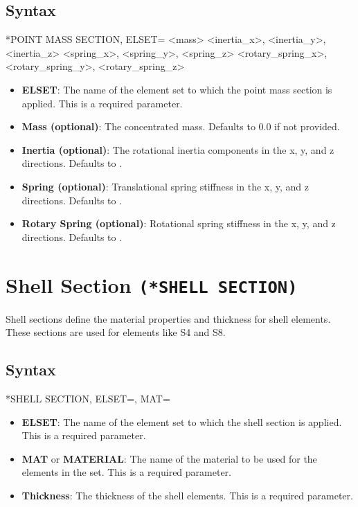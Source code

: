 \subsection{Syntax}
\begin{codeBlock}
*POINT MASS SECTION, ELSET=
<mass>
<inertia_x>, <inertia_y>, <inertia_z>
<spring_x>, <spring_y>, <spring_z>
<rotary_spring_x>, <rotary_spring_y>, <rotary_spring_z>
\end{codeBlock}

\begin{itemize}
\item \textbf{ELSET}: The name of the element set to which the point mass section is applied. This is a required parameter.
\item \textbf{Mass (optional)}: The concentrated mass. Defaults to 0.0 if not provided.
\item \textbf{Inertia (optional)}: The rotational inertia components in the x, y, and z directions. Defaults to .
\item \textbf{Spring (optional)}: Translational spring stiffness in the x, y, and z directions. Defaults to .
\item \textbf{Rotary Spring (optional)}: Rotational spring stiffness in the x, y, and z directions. Defaults to .
\end{itemize}

\section{Shell Section \texttt{(*SHELL SECTION)}}
Shell sections define the material properties and thickness for shell elements. These sections are used for elements like S4 and S8.

\subsection{Syntax}
\begin{codeBlock}
*SHELL SECTION, ELSET=, MAT=

\end{codeBlock}

\begin{itemize}
\item \textbf{ELSET}: The name of the element set to which the shell section is applied. This is a required parameter.
\item \textbf{MAT} or \textbf{MATERIAL}: The name of the material to be used for the elements in the set. This is a required parameter.
\item \textbf{Thickness}: The thickness of the shell elements. This is a required parameter.
\end{itemize}

